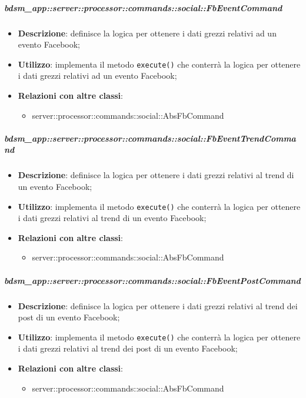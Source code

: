         \subparagraph{bdsm\_app::server::processor::commands::social::FbEventCommand} %
        \label{subp:bdsm_app_server_processor_commands_social_fbeventcommand}
        \begin{itemize}
          \item \textbf{Descrizione}: definisce la logica per ottenere i dati grezzi relativi ad un evento Facebook;
          \item \textbf{Utilizzo}: implementa il metodo \texttt{execute()} che conterrà la logica per ottenere i dati grezzi relativi ad un evento Facebook;
          \item \textbf{Relazioni con altre classi}:
            \begin{itemize}
              \item server::processor::commands::social::AbsFbCommand
            \end{itemize}
        \end{itemize}

        \subparagraph{bdsm\_app::server::processor::commands::social::FbEventTrendCommand} %
        \label{subp:bdsm_app_server_processor_commands_social_fbeventtrendcommand}
        \begin{itemize}
          \item \textbf{Descrizione}: definisce la logica per ottenere i dati grezzi relativi al trend di un evento Facebook;
          \item \textbf{Utilizzo}: implementa il metodo \texttt{execute()} che conterrà la logica per ottenere i dati grezzi relativi al trend di un evento Facebook;
          \item \textbf{Relazioni con altre classi}:
            \begin{itemize}
              \item server::processor::commands::social::AbsFbCommand
            \end{itemize}
        \end{itemize}

        \subparagraph{bdsm\_app::server::processor::commands::social::FbEventPostCommand} %
        \label{subp:bdsm_app_server_processor_commands_social_fbeventpostcommand}
        \begin{itemize}
          \item \textbf{Descrizione}: definisce la logica per ottenere i dati grezzi relativi al trend dei post di un evento Facebook;
          \item \textbf{Utilizzo}: implementa il metodo \texttt{execute()} che conterrà la logica per ottenere i dati grezzi relativi al trend dei post di un evento Facebook;
          \item \textbf{Relazioni con altre classi}:
            \begin{itemize}
              \item server::processor::commands::social::AbsFbCommand
            \end{itemize}
        \end{itemize}

